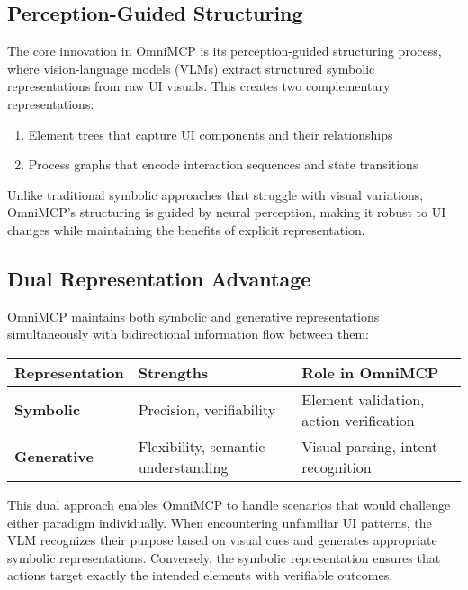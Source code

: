 \documentclass{article}
\begin{document}
\subsection{Perception-Guided Structuring}

The core innovation in OmniMCP is its perception-guided structuring process, where vision-language models (VLMs) extract structured symbolic representations from raw UI visuals. This creates two complementary representations:

\begin{enumerate}
    \item Element trees that capture UI components and their relationships
    \item Process graphs that encode interaction sequences and state transitions
\end{enumerate}

Unlike traditional symbolic approaches that struggle with visual variations, OmniMCP's structuring is guided by neural perception, making it robust to UI changes while maintaining the benefits of explicit representation.

\subsection{Dual Representation Advantage}

OmniMCP maintains both symbolic and generative representations simultaneously with bidirectional information flow between them:

\begin{center}
\begin{tabular}{|l|l|l|}
\hline
\textbf{Representation} & \textbf{Strengths} & \textbf{Role in OmniMCP} \\
\hline
\textbf{Symbolic} & Precision, verifiability & Element validation, action verification \\
\hline
\textbf{Generative} & Flexibility, semantic understanding & Visual parsing, intent recognition \\
\hline
\end{tabular}
\end{center}

This dual approach enables OmniMCP to handle scenarios that would challenge either paradigm individually. When encountering unfamiliar UI patterns, the VLM recognizes their purpose based on visual cues and generates appropriate symbolic representations. Conversely, the symbolic representation ensures that actions target exactly the intended elements with verifiable outcomes.
\end{document}
